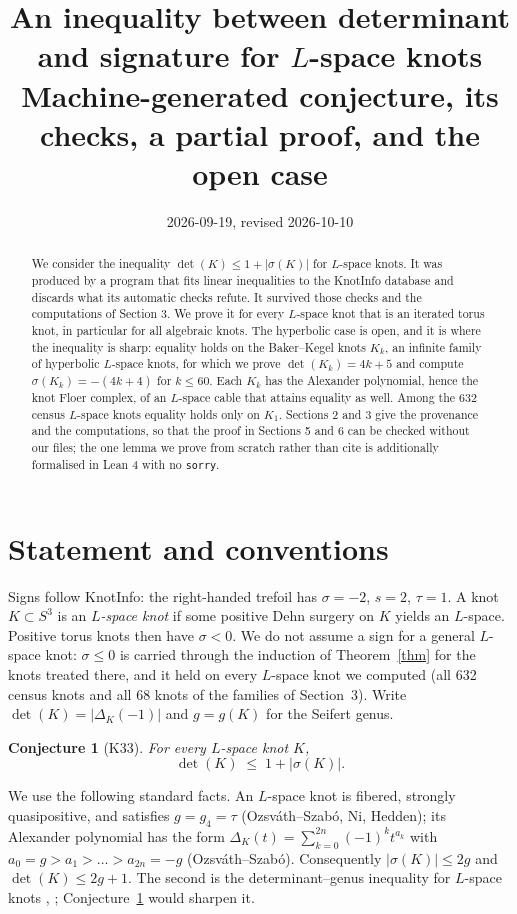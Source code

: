 \documentclass[11pt]{article}
\title{An inequality between determinant and signature for $L$-space knots\\[2mm]
\large Machine-generated conjecture, its checks, a partial proof, and the open case}
\date{2026-09-19, revised 2026-10-10}
\newtheorem{conjecture}{Conjecture}
\theoremstyle{definition}
\begin{document}
\maketitle

\begin{abstract}
We consider the inequality $\det(K) \le 1 + |\sigma(K)|$ for $L$-space knots. It was produced by a program that fits
linear inequalities to the KnotInfo database and discards what its automatic checks refute. It survived those checks
and the computations of Section 3. We prove it for every $L$-space knot that is an iterated torus knot, in
particular for all algebraic knots. The hyperbolic case is open, and it is where the inequality is sharp:
equality holds on the Baker--Kegel knots $K_k$, an infinite family of hyperbolic $L$-space knots, for which we prove
$\det(K_k) = 4k+5$ and compute $\sigma(K_k) = -(4k+4)$ for $k \le 60$. Each $K_k$ has the Alexander polynomial, hence
the knot Floer complex, of an $L$-space cable that attains equality as well. Among the 632 census $L$-space knots
equality holds only on $K_1$.
Sections 2 and 3 give the provenance and the computations, so that the proof in Sections 5 and 6 can be checked
without our files; the one lemma we prove from scratch rather than cite is additionally formalised in Lean 4
with no \texttt{sorry}.
\end{abstract}

\section{Statement and conventions}

Signs follow KnotInfo: the right-handed trefoil has $\sigma = -2$, $s = 2$, $\tau = 1$. A knot $K \subset S^3$ is an
\emph{$L$-space knot} if some positive Dehn surgery on $K$ yields an $L$-space. Positive torus knots then have
$\sigma < 0$. We do not assume a sign for a general $L$-space knot: $\sigma \le 0$ is carried through the induction of
Theorem~\ref{thm} for the knots treated there, and it held on every $L$-space knot we computed (all 632 census knots
and all 68 knots of the families of Section~3). Write $\det(K) = |\Delta_K(-1)|$ and $g = g(K)$ for the Seifert genus.

\begin{conjecture}[K33]\label{conj}
For every $L$-space knot $K$, \[ \det(K) \;\le\; 1 + |\sigma(K)| . \]
\end{conjecture}

We use the following standard facts. An $L$-space knot is fibered, strongly quasipositive, and satisfies
$g = g_4 = \tau$ (Ozsv\'ath--Szab\'o, Ni, Hedden); its Alexander polynomial has the form
$\Delta_K(t) = \sum_{k=0}^{2n} (-1)^k t^{a_k}$ with $a_0 = g > a_1 > \dots > a_{2n} = -g$ (Ozsv\'ath--Szab\'o).
Consequently $|\sigma(K)| \le 2g$ and $\det(K) \le 2g+1$. The second is the determinant--genus inequality for
$L$-space knots \cite[Lemma 5]{LM}, \cite[\S 3.1]{BaM}; Conjecture~\ref{conj} would sharpen it.
\end{document}
